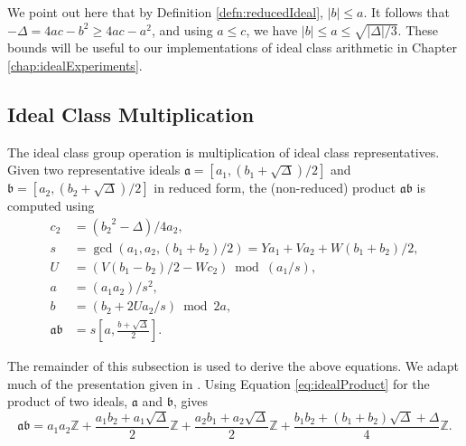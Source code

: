 \documentclass{ucalgthes1}
\theoremstyle{definition}
\newcommand{\ZZ}{\mathbb{Z}}
\newcommand{\ideal}{\mathfrak}
\begin{document}
We point out here that by Definition \ref{defn:reducedIdeal}, $|b| \le a$.  It follows that $-\Delta = 4ac - b^2 \ge 4ac -a^2$, and using $a \le c$, we have $|b| \le a \le \sqrt{|\Delta|/3}$.  These bounds will be useful to our implementations of ideal class arithmetic in Chapter \ref{chap:idealExperiments}.


\subsection{Ideal Class Multiplication}
\label{subsec:idealMultiply}

The ideal class group operation is multiplication of ideal class representatives. Given two representative ideals $\mathfrak a = [a_1, (b_1 + \sqrt{\Delta})/2]$ and $\mathfrak b = [a_2, (b_2 + \sqrt{\Delta})/2]$ in reduced form, the (non-reduced) product $\mathfrak a \mathfrak b$ is computed using
\begin{align}
	c_2 & = ({b_2}^2-\Delta)/4a_2, \nonumber \\
	s & = \gcd(a_1, a_2, (b_1+b_2)/2) = Ya_1 + Va_2 + W(b_1+b_2)/2,    \label{eq:idealProductS} \\
	U & = (V(b_1-b_2)/2 - Wc_2) \bmod{(a_1/s)},                        \label{eq:idealProductU} \\
	a & = (a_1a_2)/s^2,                                                \label{eq:idealProductA} \\
	b & = (b_2 + 2Ua_2/s) \bmod{2a},                                   \label{eq:idealProductB} \\
	\mathfrak a \mathfrak b & = s\left[a, \frac{b + \sqrt{\Delta}}{2}\right]. \nonumber
\end{align}

The remainder of this subsection is used to derive the above equations.  We adapt much of the presentation given in \cite[pp.117--118]{Jacobson2009}. Using Equation \ref{eq:idealProduct} for the product of two ideals, $\ideal a$ and $\ideal b$, gives
\begin{equation}
\label{eq:productExpanded}
\mathfrak{a} \mathfrak{b} =
a_1 a_2 \ZZ + \frac{a_1b_2 + a_1\sqrt{\Delta}}{2} \ZZ + \frac{a_2b_1 + a_2\sqrt{\Delta}}{2} \ZZ + \frac{b_1b_2 + (b_1+b_2)\sqrt{\Delta} + \Delta}{4} \ZZ.
\end{equation}
\end{document}
